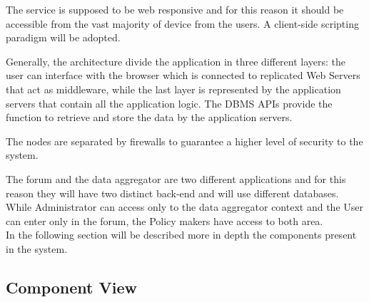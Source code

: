 The service is supposed to be web responsive and for this reason it should be accessible from the vast majority of device from the users. A client-side scripting paradigm will be adopted.

Generally, the architecture divide the application in three different layers: the user can interface with the browser which is connected to replicated Web Servers that act as middleware, while the last layer is represented by the application servers that contain all the application logic. The DBMS APIs provide the function to retrieve and store the data by the application servers.

The nodes are separated by firewalls to guarantee a higher level of security to the system.

The forum and the data aggregator are two different applications and for this reason they will have two distinct back-end and will use different databases. While Administrator can access only to the data aggregator context and the User can enter only in the forum, the Policy makers have access to both area. \\In the following section will be described more in depth the components present in the system.
\newpage
\subsection{Component View}

